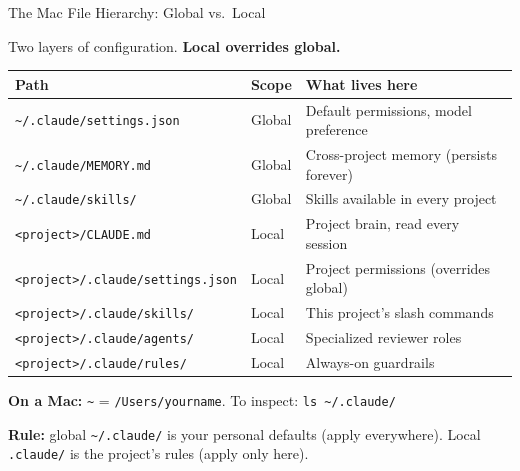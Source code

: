 \documentclass[10pt,english,aspectratio=169]{beamer}
\begin{document}
\begin{frame}{The Mac File Hierarchy: Global vs.\ Local}

Two layers of configuration. \textbf{Local overrides global.}

\vspace{0.2cm}

\begin{center}
\footnotesize
\begin{tabular}{|l|l|p{5.5cm}|}
\hline
\textbf{Path} & \textbf{Scope} & \textbf{What lives here} \\ \hline
\texttt{\textasciitilde/.claude/settings.json} & Global & Default permissions, model preference \\ \hline
\texttt{\textasciitilde/.claude/MEMORY.md} & Global & Cross-project memory (persists forever) \\ \hline
\texttt{\textasciitilde/.claude/skills/} & Global & Skills available in every project \\ \hline
\hline
\texttt{<project>/CLAUDE.md} & Local & Project brain, read every session \\ \hline
\texttt{<project>/.claude/settings.json} & Local & Project permissions (overrides global) \\ \hline
\texttt{<project>/.claude/skills/} & Local & This project's slash commands \\ \hline
\texttt{<project>/.claude/agents/} & Local & Specialized reviewer roles \\ \hline
\texttt{<project>/.claude/rules/} & Local & Always-on guardrails \\ \hline
\end{tabular}
\end{center}

\vspace{0.2cm}

\textbf{On a Mac:} \texttt{\textasciitilde} = \texttt{/Users/yourname}. To inspect: \texttt{ls \textasciitilde/.claude/}

\vspace{0.1cm}

\textbf{Rule:} global \texttt{\textasciitilde/.claude/} is your personal defaults (apply everywhere). Local \texttt{.claude/} is the project's rules (apply only here).
\end{frame}
\end{document}
